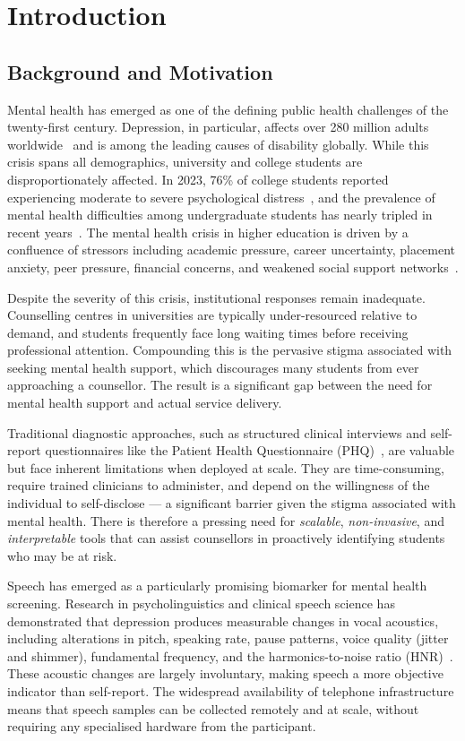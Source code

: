 \chapter{Introduction}
\label{Chapter1}

\section{Background and Motivation}

Mental health has emerged as one of the defining public health challenges of the twenty-first century. Depression, in particular, affects over 280 million adults worldwide~\cite{WHO2025} and is among the leading causes of disability globally. While this crisis spans all demographics, university and college students are disproportionately affected. In 2023, 76\% of college students reported experiencing moderate to severe psychological distress~\cite{BlackDeer2023}, and the prevalence of mental health difficulties among undergraduate students has nearly tripled in recent years~\cite{KCL2022}. The mental health crisis in higher education is driven by a confluence of stressors including academic pressure, career uncertainty, placement anxiety, peer pressure, financial concerns, and weakened social support networks~\cite{Mortier2018}.

Despite the severity of this crisis, institutional responses remain inadequate. Counselling centres in universities are typically under-resourced relative to demand, and students frequently face long waiting times before receiving professional attention. Compounding this is the pervasive stigma associated with seeking mental health support, which discourages many students from ever approaching a counsellor. The result is a significant gap between the need for mental health support and actual service delivery.

Traditional diagnostic approaches, such as structured clinical interviews and self-report questionnaires like the Patient Health Questionnaire (PHQ)~\cite{Kroenke2010}, are valuable but face inherent limitations when deployed at scale. They are time-consuming, require trained clinicians to administer, and depend on the willingness of the individual to self-disclose — a significant barrier given the stigma associated with mental health. There is therefore a pressing need for \textit{scalable}, \textit{non-invasive}, and \textit{interpretable} tools that can assist counsellors in proactively identifying students who may be at risk.

Speech has emerged as a particularly promising biomarker for mental health screening. Research in psycholinguistics and clinical speech science has demonstrated that depression produces measurable changes in vocal acoustics, including alterations in pitch, speaking rate, pause patterns, voice quality (jitter and shimmer), fundamental frequency, and the harmonics-to-noise ratio (HNR)~\cite{France2000, Cummins2015, Leal2024}. These acoustic changes are largely involuntary, making speech a more objective indicator than self-report. The widespread availability of telephone infrastructure means that speech samples can be collected remotely and at scale, without requiring any specialised hardware from the participant.

